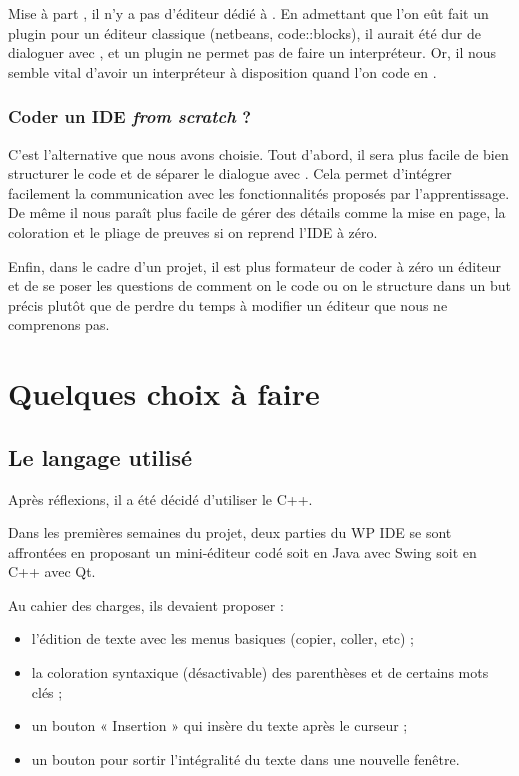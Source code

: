 Mise à part \CoqIde, il n'y a pas d'éditeur dédié à \Coq{}. En admettant que l'on eût fait un plugin pour un éditeur classique (netbeans, code::blocks), il aurait été dur de dialoguer avec \coqtop{}, et un plugin ne permet pas de faire un interpréteur. Or, il nous semble vital d'avoir un interpréteur à disposition quand l'on code en \Coq{}.

\subsubsection{Coder un IDE \emph{from scratch} ?}

C'est l'alternative que nous avons choisie.
Tout d'abord, il sera plus facile de bien structurer le code et de séparer le dialogue avec \Coq{}. 
Cela permet d'intégrer facilement la communication avec les fonctionnalités proposés par l'apprentissage.
De même il nous paraît plus facile de gérer des détails comme la mise en page, la coloration et le pliage de preuves si on reprend l'IDE à zéro.

Enfin, dans le cadre d'un projet, il est plus formateur de coder à zéro un éditeur et de se poser les questions de comment on le code ou on le structure dans un but précis plutôt que de perdre du temps à modifier un éditeur que nous ne comprenons pas.

\section{Quelques choix à faire}

\subsection{Le langage utilisé}

Après réflexions, il a été décidé d'utiliser le C++.

Dans les premières semaines du projet, deux parties du WP IDE se sont affrontées en proposant un mini-éditeur codé soit en Java avec Swing soit en C++ avec Qt. 

Au cahier des charges, ils devaient proposer : 

\begin{itemize}
  \item l'édition de texte avec les menus basiques (copier, coller, etc) ;
  \item la coloration syntaxique (désactivable) des parenthèses et de certains mots clés ;
  \item un bouton « Insertion » qui insère du texte après le curseur ;
  \item un bouton pour sortir l'intégralité du texte dans une nouvelle fenêtre.
\end{itemize}

